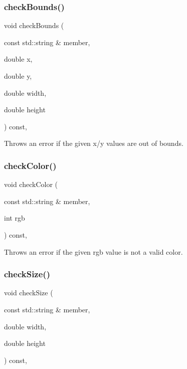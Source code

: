 \subsubsection{\texorpdfstring{check\+Bounds()}{checkBounds()}}
{\footnotesize\ttfamily void check\+Bounds (\begin{DoxyParamCaption}\item[{const std\+::string \&}]{member,  }\item[{double}]{x,  }\item[{double}]{y,  }\item[{double}]{width,  }\item[{double}]{height }\end{DoxyParamCaption}) const\hspace{0.3cm}{\ttfamily [protected]}, {\ttfamily [inherited]}}



Throws an error if the given x/y values are out of bounds. 

\mbox{\label{classsgl_1_1GDrawingSurface_a9841b5dc607ca41a14819d80e1d8a09c}} 
\subsubsection{\texorpdfstring{check\+Color()}{checkColor()}}
{\footnotesize\ttfamily void check\+Color (\begin{DoxyParamCaption}\item[{const std\+::string \&}]{member,  }\item[{int}]{rgb }\end{DoxyParamCaption}) const\hspace{0.3cm}{\ttfamily [protected]}, {\ttfamily [inherited]}}



Throws an error if the given rgb value is not a valid color. 

\mbox{\label{classsgl_1_1GDrawingSurface_a70a6546707ae708573396616bd0f5320}} 
\subsubsection{\texorpdfstring{check\+Size()}{checkSize()}}
{\footnotesize\ttfamily void check\+Size (\begin{DoxyParamCaption}\item[{const std\+::string \&}]{member,  }\item[{double}]{width,  }\item[{double}]{height }\end{DoxyParamCaption}) const\hspace{0.3cm}{\ttfamily [protected]}, {\ttfamily [inherited]}}



